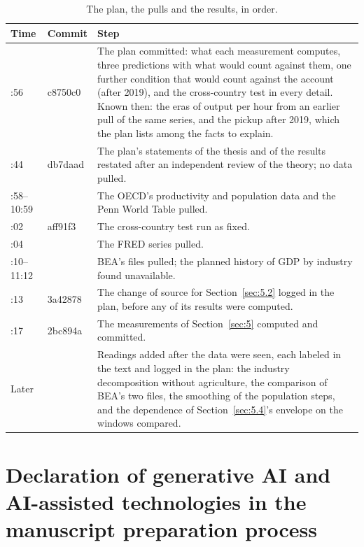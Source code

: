 \documentclass[12pt]{article}
\theoremstyle{plain}
\begin{document}
\begin{table}[htbp]
\centering
\caption{The plan, the pulls and the results, in order.}
\label{tab:C.1}
\footnotesize
\renewcommand{\arraystretch}{1.15}
\begin{tabular}{@{}>{\raggedright\arraybackslash}p{}>{\raggedright\arraybackslash}p{}>{\raggedright\arraybackslash}p{}@{}}
\toprule
Time & Commit & Step \\
\midrule
09:56 & c8750c0 & The plan committed: what each measurement computes, three predictions with what would count against them, one further condition that would count against the account (after 2019), and the cross-country test in every detail. Known then: the eras of output per hour from an earlier pull of the same series, and the pickup after 2019, which the plan lists among the facts to explain. \\
10:44 & db7daad & The plan's statements of the thesis and of the results restated after an independent review of the theory; no data pulled. \\
10:58--10:59 & & The OECD's productivity and population data and the Penn World Table pulled. \\
11:02 & aff91f3 & The cross-country test run as fixed. \\
11:04 & & The FRED series pulled. \\
11:10--11:12 & & BEA's files pulled; the planned history of GDP by industry found unavailable. \\
11:13 & 3a42878 & The change of source for Section~\ref{sec:5.2} logged in the plan, before any of its results were computed. \\
11:17 & 2bc894a & The measurements of Section~\ref{sec:5} computed and committed. \\
Later & & Readings added after the data were seen, each labeled in the text and logged in the plan: the industry decomposition without agriculture, the comparison of BEA's two files, the smoothing of the population steps, and the dependence of Section~\ref{sec:5.4}'s envelope on the windows compared. \\
\bottomrule
\end{tabular}
\end{table}

\section*{Declaration of generative AI and AI-assisted technologies in the manuscript preparation process}
\end{document}
